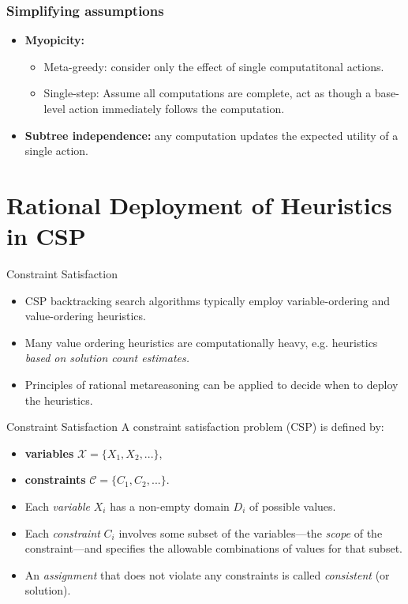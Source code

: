 \documentclass{beamer}
\begin{document}
\begin{frame}
\frametitle{Simplifying assumptions}
\begin{itemize}
\item {\bf Myopicity:}
  \begin{itemize}
  \item Meta-greedy: consider only the effect of single computatitonal actions.
  \item Single-step: Assume all computations are complete, act as
    though a base-level action immediately follows the computation.
  \end{itemize}
\item {\bf Subtree independence:} any computation updates the expected
  utility of a single action.
\end{itemize}
\end{frame}
  
\section{Rational Deployment of Heuristics in CSP}

\begin{frame}{Constraint Satisfaction}
\begin{itemize}
\item CSP backtracking search algorithms typically employ
  variable-ordering and value-ordering heuristics.
\item Many value ordering heuristics are computationally
  heavy, e.g. heuristics {\it based on solution count
          estimates.}
\item Principles of rational metareasoning can be applied
          to decide when to deploy the heuristics.
\end{itemize}
\end{frame}

\begin{frame}{Constraint Satisfaction}
A constraint satisfaction problem (CSP) is defined by:
\begin{itemize}
\item[] {\bf variables} $\mathcal{X}=\{X_1, X_2, ...\}$, 
\item[] {\bf constraints} $\mathcal{C}=\{C_1, C_2, ...\}$. 
\end{itemize}
\begin{itemize}
 \item Each {\it variable} $X_i$ has a non-empty domain
          $D_i$ of possible values. 
\item Each {\it constraint} $C_i$ involves some subset
          of the variables---the {\it scope} of the constraint---and specifies the
          allowable combinations of values for that subset. 
\item An {\it assignment} that does not violate any constraints is called
          {\it consistent} (or solution).
 \end{itemize}
 \end{frame}
\end{document}
